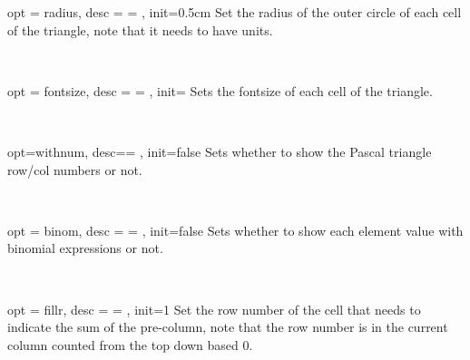 \documentclass[full]{l3doc}
\begin{document}
\begin{documentation}
\bigskip

\begin{option}{ opt = radius, desc = {= }, init=0.5cm }
  Set the radius of the outer circle of each cell of the triangle,
  note that it needs to have units.
\end{option}\\
\begin{SideBySideExample}[frame=single,numbers=left,xrightmargin=.65\linewidth,gobble=2]
  \centering
\end{SideBySideExample}

\bigskip

\begin{option}{ opt = fontsize, desc = {= }, init= }
  Sets the fontsize of each cell of the triangle.
\end{option}\\
\begin{SideBySideExample}[frame=single,numbers=left,xrightmargin=.65\linewidth,gobble=2]
  \centering
\end{SideBySideExample}

\bigskip

\begin{option}{opt=withnum, desc={= }, init=false}
  Sets whether to show the Pascal triangle row/col numbers or not.
\end{option}\\
\begin{SideBySideExample}[frame=single,numbers=left,xrightmargin=.63\linewidth,gobble=2]
  \centering
\end{SideBySideExample}

\bigskip

\begin{option}{opt = binom, desc = {= }, init=false}
  Sets whether to show each element value with binomial expressions or not.
\end{option}\\
\begin{SideBySideExample}[frame=single,numbers=left,xrightmargin=.63\linewidth,gobble=2]
  \centering
\end{SideBySideExample}

\bigskip

\begin{option}{ opt = fillr, desc = {= }, init=1 }
  Set the row number of the cell that needs to indicate the sum of the pre-column,
  note that the row number is in the current column counted from the top down based 0.
\end{option}


\end{documentation}
\end{document}

